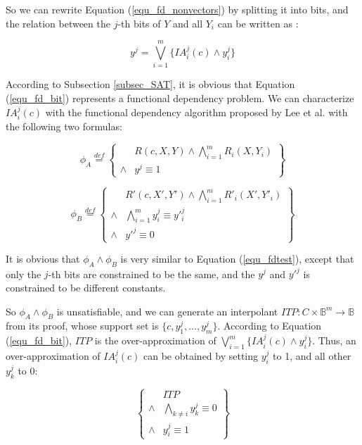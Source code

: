 \documentclass[journal]{IEEEtran}
\begin{document}
So we can rewrite Equation (\ref{equ_fd_nonvectors}) by splitting it into bits,
and the relation between the $j$-th bits of $Y$ and all $Y_i$ can be written as :

\begin{equation}\label{equ_fd_bit}
y^{j}=\bigvee _{i=1}^{m} \{IA^j_i(c)\wedge y^j_i\}
\end{equation}

According to Subsection \ref{subsec_SAT},
it is obvious that Equation (\ref{equ_fd_bit}) represents a functional dependency problem.
We can characterize $IA^j_i(c)$ with the functional dependency algorithm proposed by Lee et al. \cite{funcdep} with the following two formulas:

\begin{equation}\label{equ_fdtestbitA}
\phi_A \stackrel{def}{=}\left\{
\begin{array}{cc}
      & R(c,X,Y)\wedge \bigwedge_{i=1}^{m}R_i(X,Y_i)  \\
\wedge& y^j\equiv 1
\end{array}
\right\}
\end{equation}

\begin{equation}\label{equ_fdtestbitB}
\phi_B \stackrel{def}{=}\left\{
\begin{array}{cc}
& R'(c,X',Y') \wedge \bigwedge_{i=1}^{m}R'_i(X',Y'_i)  \\
\wedge&\bigwedge_{i=1}^{m}y^j_i\equiv y'^j_i\\
\wedge& y'^j\equiv 0
\end{array}
\right\}
\end{equation}

It is obvious that $\phi_A\wedge \phi_B$ is very similar to Equation (\ref{equ_fdtest}),
except that only the $j$-th bits are constrained to be the same,
and the $y^j$ and $y'^j$ is constrained to be different constants.

So $\phi_A\wedge \phi_B$ is unsatisfiable,
and we can generate an interpolant $ITP:C\times\mathbb{B}^m\to \mathbb{B}$ from its proof,
whose support set is $\{c,y^j_1,\dots,y^j_m\}$.
According to Equation (\ref{equ_fd_bit}),
$ITP$ is the over-approximation of $\bigvee _{i=1}^{m} \{IA^j_i(c)\wedge y^j_i\}$.
Thus,
an over-approximation of $IA^j_i(c)$ can be obtained by setting $y^j_i$ to 1,
and all other $y^j_k$ to 0:

\begin{equation}\label{equ_fdtestbitIA}
\left\{
\begin{array}{cc}
      & ITP  \\
\wedge&\bigwedge_{k\ne i} y^j_k\equiv 0 \\
\wedge& y^j_i\equiv 1
\end{array}
\right\}
\end{equation}
\end{document}
